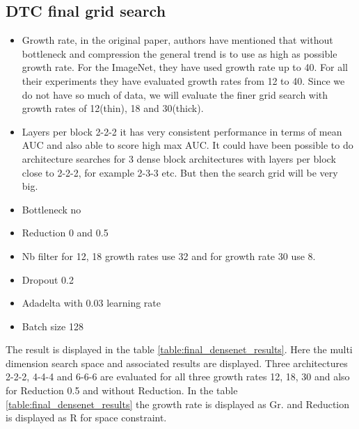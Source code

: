 \subsection{DTC final grid search}

\begin{itemize}
 \item Growth rate, in the original paper, authors have mentioned that without bottleneck and compression the general trend is to use as high as possible growth rate. For the ImageNet, they have used growth rate 
 up to 40. For all their experiments they have evaluated growth rates from 12 to 40. Since we do not have so much of data, we will evaluate the finer grid search with growth rates of 12(thin), 18 and 30(thick). 
 \item Layers per block 2-2-2 it has very consistent performance in terms of mean AUC and also able to score high max AUC. It could have been possible to do architecture searches for 3 dense block architectures 
 with layers per block close to 2-2-2, for example 2-3-3 etc. But then the search grid will be very big.
 \item Bottleneck no
 \item Reduction 0 and 0.5
 \item Nb filter for 12, 18 growth rates use 32 and for growth rate 30 use 8.
 \item Dropout 0.2
 \item Adadelta with 0.03 learning rate
 \item Batch size 128
\end{itemize}

The result is displayed in the table \ref{table:final_densenet_results}. Here the multi dimension search space and associated results are displayed. Three architectures 2-2-2, 4-4-4 and 6-6-6 are evaluated for
all three growth rates 12, 18, 30 and also for Reduction 0.5 and without Reduction. In the table \ref{table:final_densenet_results} the growth rate is displayed as Gr. and Reduction is displayed as R for space 
constraint.


